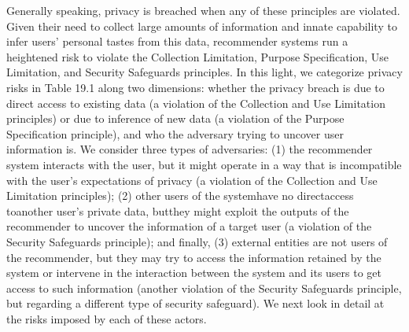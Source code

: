 Generally speaking, privacy is breached when any of these principles are violated. Given their need to collect large amounts of information and innate capability to infer users' personal tastes from this data, recommender systems run a heightened risk to violate the Collection Limitation, Purpose Specification, Use Limitation, and Security Safeguards principles. In this light, we categorize privacy risks in Table 19.1 along two dimensions: whether the privacy breach is due to direct access to existing data (a violation of the Collection and Use Limitation principles) or due to inference of new data (a violation of the Purpose Specification principle), and who the adversary trying to uncover user information is. We consider three types of adversaries: (1) the recommender system interacts with the user, but it might operate in a way that is incompatible with the user's expectations of privacy (a violation of the Collection and Use Limitation principles); (2) other users of the systemhave no directaccess toanother user's private data, butthey might exploit the outputs of the recommender to uncover the information of a target user (a violation of the Security Safeguards principle); and finally, (3) external entities are not users of the recommender, but they may try to access the information retained by the system or intervene in the interaction between the system and its users to get access to such information (another violation of the Security Safeguards principle, but regarding a different type of security safeguard). We next look in detail at the risks imposed by each of these actors.
